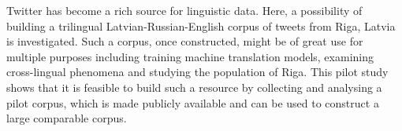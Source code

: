 Twitter has become a rich source for linguistic data. Here, a possibility of building a trilingual Latvian-Russian-English corpus of tweets from Riga, Latvia is investigated. Such a corpus, once constructed, might be of great use for multiple purposes including  training machine translation models, examining cross-lingual phenomena and studying the population of Riga. This pilot study shows that it is feasible to build such a resource by collecting and analysing a pilot corpus, which is made publicly available and can be used to construct a large comparable corpus.

